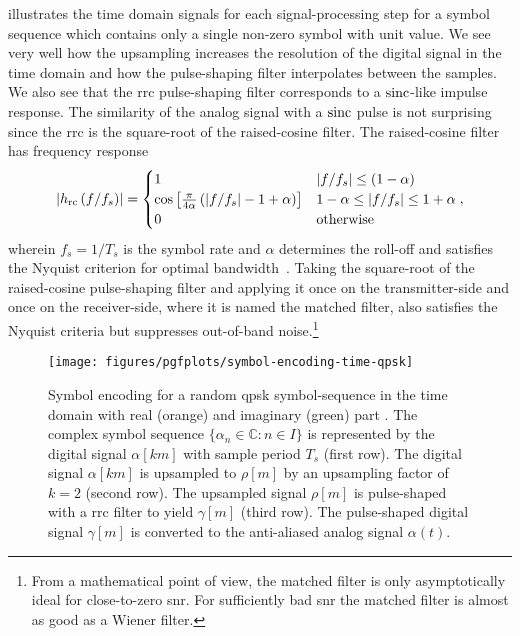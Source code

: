  illustrates the time domain signals for each signal-processing step for a symbol sequence which contains only a single non-zero symbol with unit value.
We see very well how the upsampling increases the resolution of the digital signal in the time domain and how the pulse-shaping filter interpolates between the samples.
We also see that the \gls{rrc} pulse-shaping filter corresponds to a $\sinc$-like impulse response.
The similarity of the analog signal with a $\sinc$ pulse is not surprising since the \gls{rrc} is the square-root of the raised-cosine filter.
The raised-cosine filter has frequency response
\begin{equation}
	\abs{h_\text{rc}\left(f/f_s\right)}
	=
	\begin{cases}
		1 & \abs*{f/f_s}\leq(1-\alpha) \\
		\cos\left[\frac{\pi}{4\alpha}\left(\abs*{f/f_s}-1+\alpha\right)\right] & 1-\alpha\leq\abs*{f/f_s}\leq1+\alpha \\
		0 & \text{otherwise}
	\end{cases}
	,
\end{equation}
wherein $f_s=1/T_s$ is the symbol rate and $\alpha$ determines the roll-off and satisfies the Nyquist criterion for optimal bandwidth~\cite[p.~51]{Madhow2008}.
Taking the square-root of the raised-cosine pulse-shaping filter and applying it once on the transmitter-side and once on the receiver-side, where it is named the matched filter, also satisfies the Nyquist criteria but suppresses out-of-band noise.\footnote{From a mathematical point of view, the matched filter is only asymptotically ideal for close-to-zero \gls{snr}. For sufficiently bad \gls{snr} the matched filter is almost as good as a Wiener filter.}
\begin{figure}[htb]
	\centering
	\texttt{[image: figures/pgfplots/symbol-encoding-time-qpsk]}
	\caption{Symbol encoding for a random \gls{qpsk} symbol-sequence in the time domain with real (orange) and imaginary (green) part . The complex symbol sequence $\{\alpha_n\in\mathbb{C}\colon n\in I\}$ is represented by the digital signal $\alpha[km]$ with sample period $T_s$ (first row). The digital signal $\alpha[km]$ is upsampled to $\rho[m]$ by an upsampling factor of $k=2$ (second row). The upsampled signal $\rho[m]$ is pulse-shaped with a \gls{rrc} filter to yield $\gamma[m]$ (third row). The pulse-shaped digital signal $\gamma[m]$ is converted to the anti-aliased analog signal $\alpha(t)$.}\label{fig:baseband_construction_rand_time}
\end{figure}
